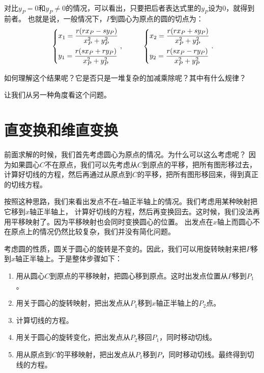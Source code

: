 \documentclass[12pt,UTF8]{ctexbook}
\begin{document}
对比$y_P=0$和$y_P\neq 0$的情况，可以看出，只要把后者表达式里的$y_P$设为$0$，就得到前者。
也就是说，一般情况下，$P$到圆心为原点的圆的切点为：
\begin{alignat*}{2}
    &   \begin{dcases}
        x_1 = \frac{r(rx_P - sy_P) }{x_P^2+y_P^2} \\
        y_1 = \frac{r(sx_P + ry_P)}{x_P^2+y_P^2}
      \end{dcases}
    ,& \quad\quad
      \begin{dcases}
        x_2 = \frac{r(rx_P + sy_P) }{x_P^2+y_P^2} \\
        y_2 = \frac{r(sx_P - ry_P)}{x_P^2+y_P^2}
      \end{dcases}
    .
\end{alignat*}

如何理解这个结果呢？它是否只是一堆复杂的加减乘除呢？其中有什么规律？

让我们从另一种角度看这个问题。

\section{直变换和维直变换}
前面求解的时候，我们首先考虑圆心为原点的情况。为什么可以这么考虑呢？
因为如果圆心$C$不在原点，我们可以先考虑从$C$到原点的平移，把所有图形移过去，
计算好切线的方程，然后再通过从原点到$C$的平移，把所有图形移回来，得到真正的切线方程。

按照这种思路，我们来看出发点不在$x$轴正半轴上的情况。我们考虑用某种映射把它移到$x$轴正半轴上，
计算好切线的方程，然后再变换回去。这时候，我们没法再用平移映射了。因为平移映射也会同时变换圆心的位置。
出发点在$x$轴上而圆心不在原点上的情况仍然比较复杂，我们并没有简化问题。

考虑圆的性质，圆关于圆心的旋转是不变的。因此，我们可以用旋转映射来把$P$移到$x$轴正半轴上。于是整体步骤如下：

\begin{enumerate}
    \item 用从圆心$C$到原点的平移映射，把圆心移到原点。这时出发点位置从$P$移到$P_1$。
    \item 用关于圆心的旋转映射，把出发点从$P_1$移到$x$轴正半轴上的$P_2$点。
    \item 计算切线的方程。
    \item 用关于圆心的旋转变化，把出发点从$P_2$移回$P_1$，同时移动切线。
    \item 用从原点到$C$的平移映射，把出发点从$P_1$移到$P$，同时移动切线。最终得到切线的方程。
\end{enumerate}
\end{document}
